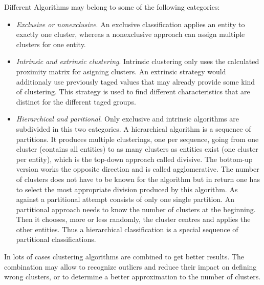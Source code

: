Different Algorithms may belong to some of the following categories: \cite{jain+dubes}
\begin{itemize}
  \item \emph{Exclusive or nonexclusive}. An exclusive
 classification applies an entity to exactly one cluster, whereas a nonexclusive approach can assign multiple clusters
 for one entity.
  \item \emph{Intrinsic and extrinsic clustering}. Intrinsic clustering only
uses the calculated proximity matrix for asigning clusters. An extrinsic strategy would additionaly use previously
taged values that may already provide some kind of clustering. This strategy is used to find different characteristics
that are distinct for the different taged groups.
  \item \emph{Hierarchical and paritional}. Only exclusive and intrinsic algorithms are subdivided in this two categories.
  A hierarchical algorithm is a sequence of partitions. It produces multiple clusterings, one per sequence, going from
  one cluster (contains all entities) to as many clusters as entities exist (one cluster per entity), which is the top-down
  approach called divisive. The bottom-up version works the opposite direction and is called agglomerative. The number of
  clusters does not have to be known for the algorithm but in return one has to select the most appropriate division
  produced by this algorithm.
  As against a partitional attempt consists of only one single partition. An partitional approach needs to know the number
  of clusters at the beginning. Then it chooses, more or less randomly, the cluster centres and applies the other entities.
  Thus a hierarchical classification is a special sequence of partitional classifications.

\end{itemize}

In lots of cases clustering algorithms are combined to get better results. The combination may allow to recognize outliers
and reduce their impact on defining wrong clusters, or to determine a better approximation to the number of clusters.
